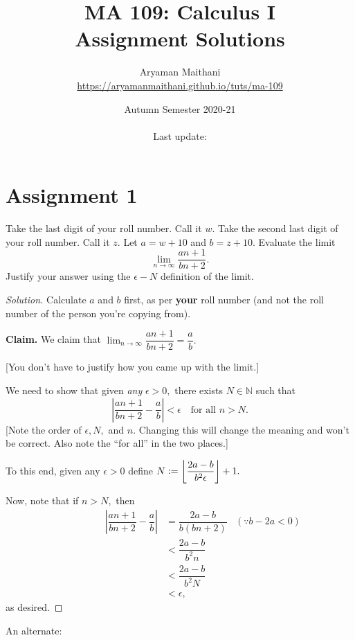 \documentclass[12pt]{article}
\title{MA 109: Calculus I\\\large{Assignment Solutions}}
\author{Aryaman Maithani\\\url{https://aryamanmaithani.github.io/tuts/ma-109}}
\date{Autumn Semester 2020-21\\~\\Last update: \DTMnow}
\theoremstyle{definition}
\newenvironment{soln}{\begin{proof}[Solution]}{\end{proof}}
\newcommand{\remark}[1]{{\color{gray}[#1]}}
\newcommand{\md}[1]{\left\lvert #1 \right\lvert}
\newcommand{\fl}[1]{\left\lfloor #1 \right\rfloor}
\begin{document}
\maketitle
\tableofcontents
\newpage
\section{Assignment 1}
Take the last digit of your roll number. Call it $w.$ Take the second last digit of your roll number. Call it $z.$ Let $a = w + 10$ and $b = z + 10.$ Evaluate the limit
\begin{equation*} 
	\lim_{n\to \infty}\dfrac{an + 1}{bn + 2}.
\end{equation*}	
Justify your answer using the $\epsilon-N$ definition of the limit.

\begin{soln}
	Calculate $a$ and $b$ first, as per \textbf{your} roll number (and not the roll number of the person you're copying from).

	\textbf{Claim.} We claim that $\displaystyle\lim_{n\to \infty}\dfrac{an + 1}{bn + 2} = \dfrac{a}{b}.$ 

	\remark{You don't have to justify how you came up with the limit.}

	We need to show that given \emph{any} $\epsilon > 0,$ there exists $N \in \mathbb{N}$ such that
	\begin{equation*} 
		\md{\dfrac{an + 1}{bn + 2} - \dfrac{a}{b}} < \epsilon\quad\text{for all } n > N.
	\end{equation*}
	\remark{Note the order of $\epsilon, N,$ and $n.$ Changing this will change the meaning and won't be correct. Also note the ``for all'' in the two places.}

	To this end, given any $\epsilon > 0$ define $N \vcentcolon= \fl{\dfrac{2a - b}{b^2\epsilon}} + 1.$
	
	Now, note that if $n > N,$ then
	\begin{align*} 
		\hspace{2cm}\md{\dfrac{an + 1}{bn + 2} - \dfrac{a}{b}} &= \dfrac{2a - b}{b(bn + 2)} & (\because b - 2a < 0)\\
		&< \dfrac{2a - b}{b^2n}\\
		&< \dfrac{2a - b}{b^2N}\\
		&< \epsilon,
	\end{align*}
	as desired.
\end{soln}

An alternate:
\end{document}
